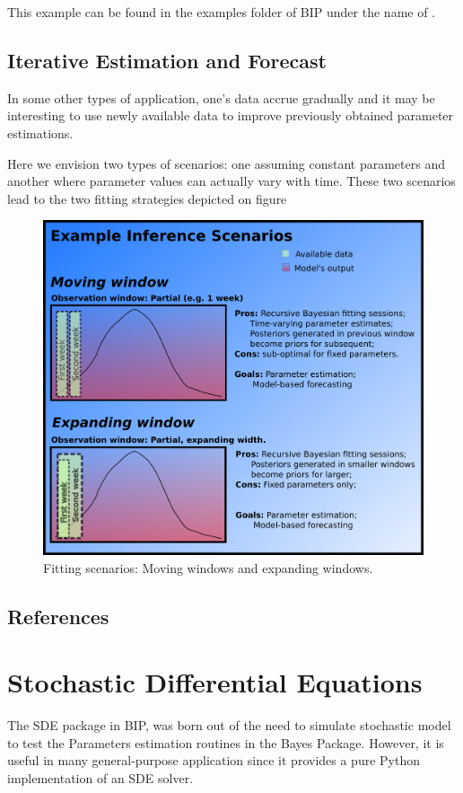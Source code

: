 \documentclass[a4paper,10pt,english]{sphinxmanual}
\begin{document}
This example can be found in the examples folder of BIP under the name of .


\subsection{Iterative Estimation and Forecast}
\label{paramest:iterative-estimation-and-forecast}
In some other types of application, one's data accrue gradually and it may be interesting to use newly available data to improve previously obtained parameter estimations.

Here we envision two types of scenarios: one assuming constant parameters and another where parameter values can actually vary with time. These two scenarios lead to the two fitting strategies depicted on figure
\begin{figure}[htbp]
\centering
\capstart

\includegraphics[width=15cm]{Inference_scenarios2.png}
\caption{Fitting scenarios: Moving windows and expanding windows.}\end{figure}


\subsection{References}
\label{paramest:references}

\section{Stochastic Differential Equations}
\label{sde:stochastic-differential-equations}\label{sde:sde}\label{sde::doc}
The SDE package in BIP, was born out of the need to simulate stochastic model to test the Parameters estimation routines in the Bayes Package. However, it is useful in many general-purpose application since it provides a pure Python implementation of an SDE solver.
\end{document}

